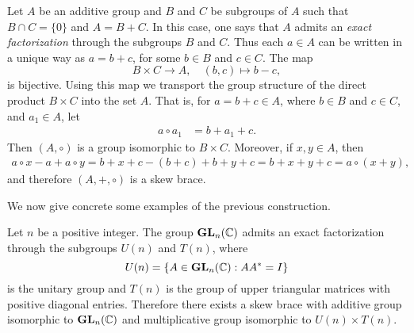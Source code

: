 \begin{example}
    \label{exa:WX}
    Let $A$ be an additive group
	and $B$ and $C$ be subgroups of $A$ such that $B\cap C=\{ 0\}$ and $A=B+C$. In this case, one says that $A$ admits an {\em exact factorization} through the subgroups $B$ and $C$.  Thus each $a\in A$ can be written in a unique
	way as $a=b+c$, for some $b\in B$ and $c\in C$.  The map
	\[
		B\times C\to A,\quad
		(b,c)\mapsto b-c,
	\]
	is bijective. Using this map we transport the group structure of the direct
	product $B\times C$ into the set $A$. That is, for $a=b+c\in A$, where $b\in B$ and $c\in C$, and
	$a_1\in A$, let 
	\begin{align*}
		a\circ a_1&=b+a_1+c.
	\end{align*}
	Then $(A,\circ)$ is a group isomorphic to $B\times C$. Moreover, if $x,y\in A$, 
	then 
	\begin{align*}
	a\circ x-a+a\circ y=b+x+c-(b+c)+b+y+c=b+x+y+c=a\circ (x+y),
	\end{align*}
	and therefore $(A,+,\circ)$ is a skew brace. 
\end{example}


We now give concrete some examples of the previous construction. 

\begin{example}
  \label{exa:QR}
  Let $n$ be a positive integer. 
  The group $\mathbf{GL}_n(\mathbb{C})$ admits an
  exact factorization through the subgroups $U(n)$ and $T(n)$, where 
  \[
  U(n)=\{ A\in\mathbf{GL}_n(\mathbb{C}): AA^*=I\}
  \]
  is the unitary group and $T(n)$ is the group of upper triangular matrices
  with positive diagonal entries.  Therefore there exists a skew brace with additive group 
  isomorphic to $\mathbf{GL}_n(\mathbb{C})$ and multiplicative group isomorphic to $U(n)\times T(n)$.  
\end{example}

